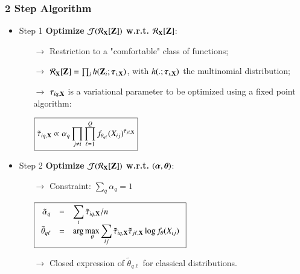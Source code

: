 \documentclass{beamer}
\newcommand{\Zbf}{{\bf Z}}
\newcommand{\Xbf}{{\bf X}}
\newcommand{\alphabf}{\text{\mathversion{bold}{$\alpha$}}}
\newcommand{\thetabf}{\mbox{\mathversion{bold}{$\theta$}}}
\newcommand{\taubf}{\mbox{\mathversion{bold}{$\tau$}}}
\newcommand{\RX}{\mathcal{R}_{\Xbf}}
\newenvironment{disarray}%
 {\everymath{\displaystyle\everymath{}}\array}%
 {\endarray}
\begin{document}
\begin{frame}
  \frametitle{2 Step Algorithm}
  \begin{itemize}
  \item \alert{Step 1} \textbf{Optimize $\mathcal{J}(\RX[\Zbf])$ w.r.t.
    $\RX[\Zbf]$}:
    \begin{itemize}
    \item[\bf{$\rightarrow$}] Restriction to a "comfortable" class of
      functions;
    \item[\bf{$\rightarrow$}] $\RX[\Zbf]=\prod_i h(\Zbf_i;\taubf_{i,\Xbf})$,
      with $h(.;\taubf_{i,\Xbf})$ the multinomial distribution;
    \item[\bf{$\rightarrow$}] $\tau_{iq,\Xbf}$ is a variational parameter
      to be optimized using a fixed point algorithm:
      \begin{center}
        $
        \boxed{
          \tilde{\tau}_{iq,\Xbf} \propto \displaystyle \alpha_q
          \prod_{j \neq i} \prod_{\ell=1}^Q f_{\theta_{q\ell}}(X_{ij})^{\tilde{\tau}_{j\ell,\Xbf}}
        }
        $
      \end{center}
    \end{itemize}
    \bigskip
    \pause
  \item \alert{Step 2} \textbf{Optimize $\mathcal{J}(\RX[\Zbf])$ w.r.t.
      $(\alphabf,\thetabf)$}:
    \begin{itemize}
    \item[\bf{$\rightarrow$}] Constraint: $\sum_q \alpha_q =1$
      \begin{center}
        $
        \boxed{
          \begin{disarray}{rcl}
            \tilde{\alpha}_q & = & \sum_i \tilde{\tau}_{iq,\Xbf}/n \\
            \tilde{\theta}_{q\ell} & = & \arg\max_{\theta} \sum_{ij}
            \tilde{\tau}_{iq,\Xbf}\tilde{\tau}_{j\ell,\Xbf} \log{f_{\theta}(X_{ij})}
          \end{disarray}
        }
        $
      \end{center}
    \item[\bf{$\rightarrow$}] Closed expression of $\tilde{\theta}_{q\ell}$ for
      classical distributions.
    \end{itemize}
  \end{itemize}
\end{frame}

\end{document}
